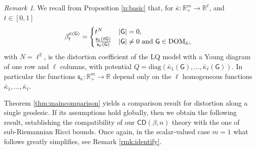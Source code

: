 \documentclass[11pt,a4paper]{article}
\theoremstyle{plain}
\theoremstyle{definition}
\theoremstyle{remark}
\newtheorem{remark}[theorem]{Remark}
\numberwithin{equation}{section}
\newcommand{\R}{\mathbb{R}} %
\newcommand{\DOM}{{\rm{DOM}}}
\newcommand{\CD}{\mathsf{CD}}
\newcommand{\sfs}{\mathsf{s}}
\newcommand{\sfG}{\mathsf G}
\begin{document}
\begin{remark}\label{rmk:linkbetabeta}
We recall from Proposition \ref{p:basic} that, for $\bar{\kappa} : \R^m_+ \to \R^\ell$, and $t\in [0,1]$
\begin{equation}
\beta_t^{\bar{\kappa}(\sfG)} = \begin{cases}
t^N & |\sfG|=0, \\
\frac{\sfs_{\bar{\kappa}}(t\sfG)}{\sfs_{\bar{\kappa}}(\sfG)} & |\sfG|\neq 0 \text{ and } \sfG \in \DOM_{\bar{\kappa}},
\end{cases}
\end{equation}
with $N=\ell^2$, is the distortion coefficient of the LQ model with a Young diagram of one row and $\ell$ columns, with potential $Q=\mathrm{diag}(\bar{\kappa}_1(\sfG),\dots,\bar{\kappa}_\ell (\sfG))$. In particular the functions $\sfs_{\bar{\kappa}}:  \R^m_+ \to \R$ depend only on the $\ell$ homogeneous functions $\bar{\kappa}_1,\dots,\bar{\kappa}_\ell$.
\end{remark}

Theorem \ref{thm:maincomparison} yields a comparison result for distortion along a single geodesic. If its assumptions hold globally, then we obtain the following result, establishing the compatibility of our $\CD(\beta,n)$ theory with the one of sub-Riemannian Ricci bounds. Once again, in the scalar-valued case $m=1$ what follows greatly simplifies, see Remark \ref{rmk:identify}.
\end{document}
